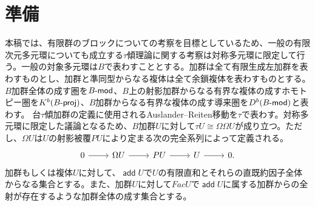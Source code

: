 \documentclass[a4paper,uplatex,dvipdfmx]{jsarticle}
\theoremstyle{definition}
\newcommand{\lmod}{\operatorname{\mathsf{\hspace{-2pt}-mod}}}
\newcommand{\lproj}{\operatorname{\mathsf{\hspace{-2pt}-proj}}}
\newcommand{\add}{\operatorname{\mathsf{add}}}
\begin{document}
\section{準備}
本稿では、有限群のブロックについての考察を目標としているため、一般の有限次元多元環についても成立する\(\tau\)傾理論に関する考察は対称多元環に限定して行う。一般の対象多元環は\(B\)で表わすこととする。加群は全て有限生成左加群を表わすものとし、加群と準同型からなる複体は全て余鎖複体を表わすものとする。\(B\)加群全体の成す圏を\(B\lmod\)、\(B\)上の射影加群からなる有界な複体の成すホモトピー圏を\(K^b(B\lproj)\)、\(B\)加群からなる有界な複体の成す導来圏を\(D^b(B\lmod)\)と表わす。
台\(\tau\)傾加群の定義に使用されるAuslander--Reiten移動を\(\tau\)で表わす。対称多元環に限定した議論となるため、\(B\)加群\(U\)に対して\(\tau U\cong \Omega \Omega U\)が成り立つ。ただし、\(\Omega U\)は\(U\)の射影被覆\(P U\)により定まる次の完全系列によって定義される。
\begin{equation}
  \begin{tikzcd}
    0\ar[r]&\Omega U \ar[r]&P U\ar[r]&U\ar[r]&0.
  \end{tikzcd}
\end{equation}
加群もしくは複体\(U\)に対して、\(\add U\)で\(U\)の有限直和とそれらの直既約因子全体からなる集合とする。また、加群\(U\)に対して\(Fac U\)で\(\add U\)に属する加群からの全射が存在するような加群全体の成す集合とする。
\end{document}

